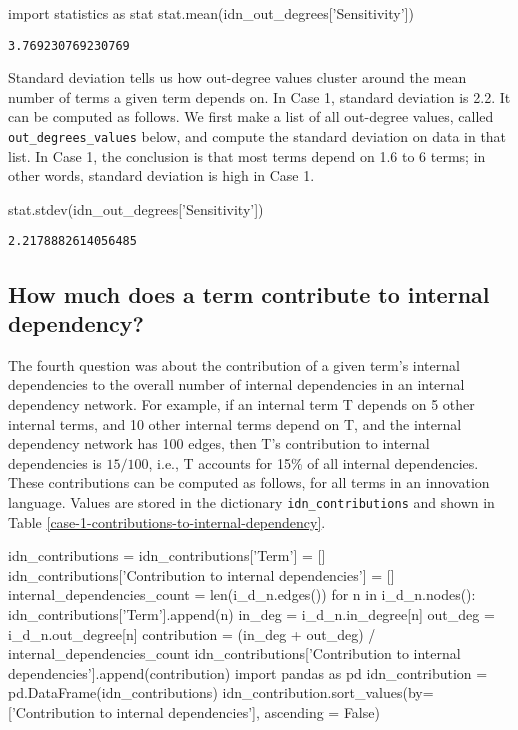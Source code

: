 \begin{pycode}
import statistics as stat
stat.mean(idn_out_degrees['Sensitivity'])
\end{pycode}

\begin{lstlisting}[breaklines]
3.769230769230769
\end{lstlisting}

Standard deviation tells us how out-degree values cluster around the mean number of terms a given term depends on. In Case 1, standard deviation is 2.2. It can be computed as follows. We first make a list of all out-degree values, called \verb|out_degrees_values| below, and compute the standard deviation on data in that list. In Case 1, the conclusion is that most terms depend on 1.6 to 6 terms; in other words, standard deviation is high in Case 1.

\begin{pycode}
stat.stdev(idn_out_degrees['Sensitivity'])
\end{pycode}

\begin{lstlisting}[breaklines]
2.2178882614056485
\end{lstlisting}


\subsection{How much does a term contribute to internal dependency?}
\label{c7:s3:ss4}
The fourth question was about the contribution of a given term's internal dependencies to the overall number of internal dependencies in an internal dependency network. For example, if an internal term T depends on 5 other internal terms, and 10 other internal terms depend on T, and the internal dependency network has 100 edges, then T's contribution to internal dependencies is $15/100$, i.e., T accounts for 15\% of all internal dependencies. These contributions can be computed as follows, for all terms in an innovation language. Values are stored in the dictionary \verb|idn_contributions| and shown in Table \ref{case-1-contributions-to-internal-dependency}.

\begin{pycode}
idn_contributions = {}
idn_contributions['Term'] = []
idn_contributions['Contribution to internal dependencies'] = []
internal_dependencies_count = len(i_d_n.edges())
for n in i_d_n.nodes():
    idn_contributions['Term'].append(n)
    in_deg = i_d_n.in_degree[n]
    out_deg = i_d_n.out_degree[n]
    contribution = (in_deg + out_deg) / internal_dependencies_count
    idn_contributions['Contribution to internal dependencies'].append(contribution) 
import pandas as pd
idn_contribution = pd.DataFrame(idn_contributions)
idn_contribution.sort_values(by=['Contribution to internal dependencies'], ascending = False)
\end{pycode}

